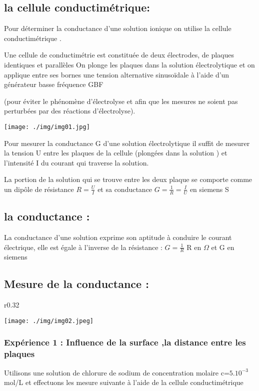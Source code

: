 \documentclass[12pt]{article}
\begin{document}
\subsection{la cellule conductimétrique: }
Pour déterminer la conductance d’une solution ionique on utilise la cellule conductimétrique .

Une cellule de conductimétrie est constituée de deux électrodes, de plaques identiques et parallèles
On plonge les plaques dans la solution électrolytique et on applique entre ses bornes une tension alternative sinusoïdale à l’aide d’un générateur basse fréquence GBF 

(pour éviter le phénomène d’électrolyse et afin que les mesures ne soient
pas perturbées par des réactions d’électrolyse).


    \texttt{[image: ./img/img01.jpg]}

Pour mesurer la conductance G d'une solution électrolytique il suffit de mesurer la tension U entre les plaques de la cellule (plongées dans la solution ) et l'intensité I du courant qui traverse la solution.

La portion de la solution qui se trouve entre les deux plaque se comporte comme un dipôle de résistance $R = \frac{U}{I}$ et sa conductance $G = \frac{1}{R} = \frac{I}{U}$ en siemens S

\subsection{la conductance : }
La conductance d'une solution exprime son aptitude à conduire le courant électrique, elle est égale à l’inverse de la
résistance : $G = \frac{1}{R}$ R en $\Omega$ et G en siemens

\subsection{Mesure de la conductance : }
\begin{wrapfigure}[10]{r}{0.32\textwidth}

\texttt{[image: ./img/img02.jpeg]}

\end{wrapfigure}
\subsubsection{Expérience 1 : Influence de la surface ,la distance entre les plaques}

Utilisons une solution de chlorure de sodium de concentration molaire c=$5.10^{-3}$ mol/L et effectuons les mesure suivante à
l’aide de la cellule conductimétrique
\end{document}
